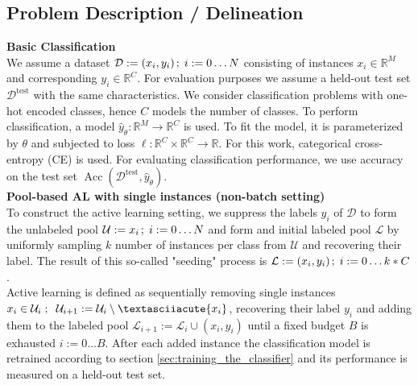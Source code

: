 \documentclass[]{article}
\begin{document}
\subsection{Problem Description / Delineation}
\textbf{Basic Classification}\\
We assume a dataset $\mathcal{D} := (x_i, y_i) \hspace{0.5mm}; \hspace{1mm} i := 0 \ldots N$ consisting of instances $x_i \in \mathbb{R}^M$ and corresponding $y_i \in \mathbb{R}^C$.
For evaluation purposes we assume a held-out test set $\mathcal{D}^{\text{test}}$ with the same characteristics.
We consider classification problems with one-hot encoded classes, hence $C$ models the number of classes.
To perform classification, a model $\hat y_\theta : \mathbb{R}^M \rightarrow \mathbb{R}^C$ is used. To fit the model, it is parameterized by $\theta$ and subjected to loss $\ell: \mathbb{R}^C \times \mathbb{R}^C \rightarrow \mathbb{R}$. For this work, categorical cross-entropy (CE) is used.
For evaluating classification performance, we use accuracy on the test set $\operatorname{Acc}(\mathcal{D}^{\text{test}}, \hat{y}_\theta)$. \\ [1mm]
%
\textbf{Pool-based AL with single instances (non-batch setting)}\\
To construct the active learning setting, we suppress the labels $y_i$ of $\mathcal{D}$ to form the unlabeled pool $\mathcal{U} := x_i \hspace{0.5mm}; \hspace{1mm} i := 0 \ldots N$ and form and initial labeled pool $\mathcal{L}$ by uniformly sampling $k$ number of instances per class from $\mathcal{U}$ and recovering their label. 
The result of this so-called "seeding" process is $\mathcal{L} := (x_i, y_i) \hspace{0.5mm}; \hspace{1mm} i := 0 \ldots k*C$. \\
Active learning is defined as sequentially removing single instances $x_i \in \mathcal{U}_i\hspace{1mm}; \hspace{2mm} \mathcal{U}_{i+1} := \mathcal{U}_i \setminus´ \{x_i\}$, recovering their label $y_i$ and adding them to the labeled pool $\mathcal{L}_{i+1} := \mathcal{L}_i \cup (x_i, y_i)$ until a fixed budget $B$ is exhausted $i := 0 \ldots B$.
After each added instance the classification model is retrained according to section \ref{sec:training_the_classifier} and its performance is measured on a held-out test set.
\end{document}
